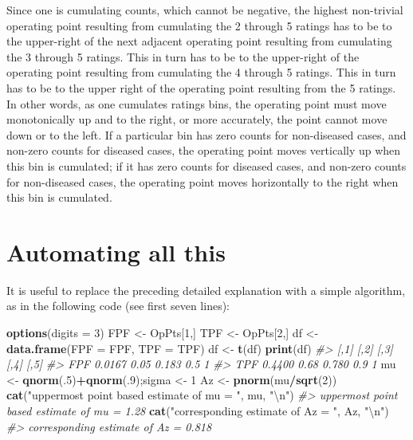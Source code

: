 \documentclass[
]{book}
\newenvironment{Shaded}{\begin{snugshade}}{\end{snugshade}}
\newcommand{\CharTok}[1]{\textcolor[rgb]{0.31,0.60,0.02}{#1}}
\newcommand{\CommentTok}[1]{\textcolor[rgb]{0.56,0.35,0.01}{\textit{#1}}}
\newcommand{\DataTypeTok}[1]{\textcolor[rgb]{0.13,0.29,0.53}{#1}}
\newcommand{\DecValTok}[1]{\textcolor[rgb]{0.00,0.00,0.81}{#1}}
\newcommand{\KeywordTok}[1]{\textcolor[rgb]{0.13,0.29,0.53}{\textbf{#1}}}
\newcommand{\NormalTok}[1]{#1}
\newcommand{\OperatorTok}[1]{\textcolor[rgb]{0.81,0.36,0.00}{\textbf{#1}}}
\newcommand{\StringTok}[1]{\textcolor[rgb]{0.31,0.60,0.02}{#1}}
\begin{document}
Since one is cumulating counts, which cannot be negative, the highest non-trivial operating point resulting from cumulating the 2 through 5 ratings has to be to the upper-right of the next adjacent operating point resulting from cumulating the 3 through 5 ratings. This in turn has to be to the upper-right of the operating point resulting from cumulating the 4 through 5 ratings. This in turn has to be to the upper right of the operating point resulting from the 5 ratings. In other words, as one cumulates ratings bins, the operating point must move monotonically up and to the right, or more accurately, the point cannot move down or to the left. If a particular bin has zero counts for non-diseased cases, and non-zero counts for diseased cases, the operating point moves vertically up when this bin is cumulated; if it has zero counts for diseased cases, and non-zero counts for non-diseased cases, the operating point moves horizontally to the right when this bin is cumulated.

\hypertarget{ratings-task-automating}{%
\section{Automating all this}\label{ratings-task-automating}}

It is useful to replace the preceding detailed explanation with a simple algorithm, as in the following code (see first seven lines):

\begin{Shaded}
\begin{Highlighting}[]
\KeywordTok{options}\NormalTok{(}\DataTypeTok{digits =} \DecValTok{3}\NormalTok{)}
\NormalTok{FPF <-}\StringTok{ }\NormalTok{OpPts[}\DecValTok{1}\NormalTok{,]}
\NormalTok{TPF <-}\StringTok{ }\NormalTok{OpPts[}\DecValTok{2}\NormalTok{,]}
\NormalTok{df <-}\StringTok{ }\KeywordTok{data.frame}\NormalTok{(}\DataTypeTok{FPF =}\NormalTok{ FPF, }\DataTypeTok{TPF =}\NormalTok{ TPF)}
\NormalTok{df <-}\StringTok{ }\KeywordTok{t}\NormalTok{(df)}
\KeywordTok{print}\NormalTok{(df)}
\CommentTok{#>       [,1] [,2]  [,3] [,4] [,5]}
\CommentTok{#> FPF 0.0167 0.05 0.183  0.5    1}
\CommentTok{#> TPF 0.4400 0.68 0.780  0.9    1}
\NormalTok{mu <-}\StringTok{ }\KeywordTok{qnorm}\NormalTok{(.}\DecValTok{5}\NormalTok{)}\OperatorTok{+}\KeywordTok{qnorm}\NormalTok{(.}\DecValTok{9}\NormalTok{);sigma <-}\StringTok{ }\DecValTok{1}
\NormalTok{Az <-}\StringTok{ }\KeywordTok{pnorm}\NormalTok{(mu}\OperatorTok{/}\KeywordTok{sqrt}\NormalTok{(}\DecValTok{2}\NormalTok{))}
\KeywordTok{cat}\NormalTok{(}\StringTok{"uppermost point based estimate of mu = "}\NormalTok{, mu, }\StringTok{"}\CharTok{\textbackslash{}n}\StringTok{"}\NormalTok{)}
\CommentTok{#> uppermost point based estimate of mu =  1.28}
\KeywordTok{cat}\NormalTok{(}\StringTok{"corresponding estimate of Az = "}\NormalTok{, Az, }\StringTok{"}\CharTok{\textbackslash{}n}\StringTok{"}\NormalTok{)}
\CommentTok{#> corresponding estimate of Az =  0.818}
\end{Highlighting}
\end{Shaded}
\end{document}
